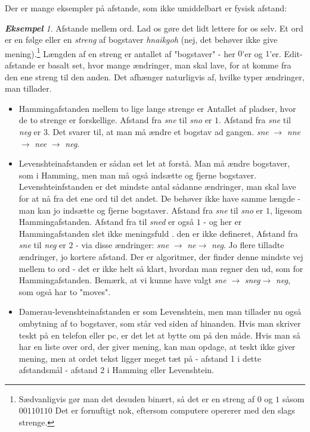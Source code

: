 \documentclass[a4paper, 12pt]{article}
\theoremstyle{remark}
\newtheorem{Eksempel}{\textbf{Eksempel}}
\begin{document}
Der er mange eksempler på afstande, som ikke umiddelbart er fysisk afstand:
\begin{Eksempel}
Afstande mellem ord. Lad os gøre det lidt lettere for os selv. Et ord er en følge eller en \emph{streng} af bogstaver \emph{hnaikgoh} (nej, det behøver ikke give mening).\footnote{Sædvanligvis gør man det desuden binært, så det er en streng af $0$ og $1$ såsom $00110110$ Det er fornuftigt nok, eftersom computere opererer med den slags strenge.} Længden af en streng er antallet af "bogstaver" - her $0$'er og $1$'er.
Edit-afstande er basalt set, hvor mange ændringer, man skal lave, for at komme fra den ene streng til den anden. Det afhænger naturligvis af, hvilke typer ændringer, man tillader. 
\begin{itemize}
\item Hammingafstanden mellem to lige lange strenge er Antallet af pladser, hvor de to strenge er forskellige. Afstand fra \emph{sne} til \emph{sno} er $1$. Afstand fra \emph{sne} til \emph{neg} er $3$. Det svarer til, at man må ændre et bogstav ad gangen. \emph{sne} $\rightarrow$ \emph{nne} $\rightarrow$ \emph{nee} $\rightarrow$ \emph{neg}.
\item Levenshteinafstanden er sådan set let at forstå. Man må ændre bogstaver, som i Hamming, men man må også indsætte og fjerne bogstaver. Levenshteinfstanden er det mindste antal sådanne ændringer, man skal  lave for at nå fra det ene ord til det andet. De behøver ikke have samme længde - man kan jo indsætte og fjerne bogstaver. Afstand fra  \emph{sne} til \emph{sno} er $1$, ligesom Hammingafstanden. Afstand fra  til \emph{sned} er også $1$ - og her er Hammingafstanden slet ikke meningsfuld . den er ikke defineret, Afstand fra \emph{sne} til \emph{neg} er $2$ - via disse ændringer: \emph{sne} $\rightarrow$ \emph{ne}$\rightarrow$ \emph{neg}. Jo flere tilladte ændringer, jo kortere afstand. Der er algoritmer, der finder denne mindste vej mellem to ord - det er ikke helt så klart, hvordan man regner den ud, som for Hammingafstanden. Bemærk, at vi kunne have valgt \emph{sne} $\rightarrow$ \emph{sneg}$\rightarrow$ \emph{neg}, som også har to "moves".
\item Damerau-levenshteinafstanden er som Levenshtein, men man tillader nu også ombytning af to bogstaver, som står ved siden af hinanden. Hvis man skriver teskt på en telefon eller pc, er det let at bytte om på den måde. Hvis man så har en liste over ord, der giver mening, kan man opdage, at teskt ikke giver mening, men at ordet tekst ligger meget tæt på - afstand 1 i dette afstandsmål - afstand 2 i Hamming eller Levenshtein.
\end{itemize}
\end{Eksempel}
\end{document}
